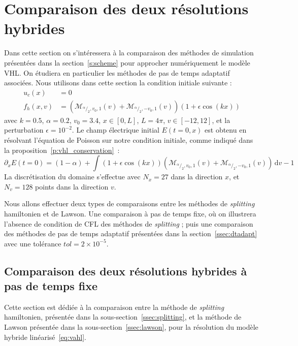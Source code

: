 
\section{Comparaison des deux résolutions hybrides}
\label{s:compare}

Dans cette section on s'intéressera à la comparaison des méthodes de simulation présentées dans la section~\ref{s:scheme} pour approcher numériquement le modèle VHL. On étudiera en particulier les méthodes de pas de temps adaptatif associées. Nous utilisons dans cette section la condition initiale suivante :
$$
  \begin{aligned}
    u_c(x)   &= 0 \\
    f_h(x,v) &=  \left(\mathcal{M}_{^\alpha/_2,v_0,1}(v) +  \mathcal{M}_{^\alpha/_2,-v_0,1}(v) \right)(1 + \epsilon\cos(kx))
  \end{aligned}
$$
avec $k=0.5$, $\alpha=0.2$, $v_0 = 3.4$, $x\in [0,L]$, $L=4\pi$, $v\in[-12,12]$, et la perturbation $\epsilon = 10^{-2}$. Le champ électrique initial $E(t=0,x)$ est obtenu en résolvant l'équation de Poisson sur notre condition initiale, comme indiqué dans la proposition~\ref{p:vhl_conservation}~:
$$
  \partial_x E(t=0) = (1-\alpha) + \int (1+\epsilon\cos(kx))\left( \mathcal{M}_{^\alpha/_2,v_0,1}(v) + \mathcal{M}_{^\alpha/_2,-v_0,1}(v) \right)\,\mathrm{d}v - 1
$$
La discrétisation du domaine s'effectue avec $N_x=27$ dans la direction $x$, et $N_v=128$ points dans la direction $v$.

Nous allons effectuer deux types de comparaisons entre les méthodes de \emph{splitting} hamiltonien et de Lawson. Une comparaison à pas de temps fixe, où on illustrera l'absence de condition de CFL des méthodes de \emph{splitting} ; puis une comparaison des méthodes de pas de temps adaptatif présentées dans la section~\ref{ssec:dtadapt} avec une tolérance $tol = 2\times10^{-5}$.

\subsection{Comparaison des deux résolutions hybrides à pas de temps fixe}

Cette section est dédiée à la comparaison entre la méthode de \emph{splitting} hamiltonien, présentée dans la sous-section~\ref{ssec:splitting}, et la méthode de Lawson présentée dans la sous-section~\ref{ssec:lawson}, pour la résolution du modèle hybride linéarisé~\eqref{eq:vahl}.

